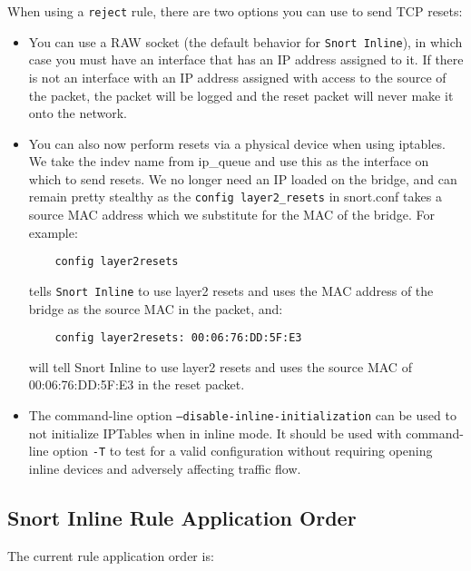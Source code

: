 \documentclass[english]{report}
\begin{document}
When using a \texttt{reject} rule, there are two options you can use to send
TCP resets:

\begin{itemize}

\item You can use a RAW socket (the default behavior for \texttt{Snort
Inline}), in which case you must have an interface that has an IP address
assigned to it. If there is not an interface with an IP address assigned with
access to the source of the packet, the packet will be logged and the reset
packet will never make it onto the network.

\item You can also now perform resets via a physical device when using
iptables.  We take the indev name from ip\_queue and use this as the interface
on which to send resets. We no longer need an IP loaded on the bridge, and can
remain pretty stealthy as the \texttt{config layer2\_resets} in
snort.conf takes a source MAC address which we substitute for the MAC of
the bridge. For example:

\begin{verbatim}
    config layer2resets
\end{verbatim}

tells \texttt{Snort Inline} to use layer2 resets and uses the MAC address of
the bridge as the source MAC in the packet, and:

\begin{verbatim}
    config layer2resets: 00:06:76:DD:5F:E3  
\end{verbatim}

will tell Snort Inline to use layer2 resets and uses the source MAC of
00:06:76:DD:5F:E3 in the reset packet.

\item The command-line option \texttt{--disable-inline-initialization} can be
used to not initialize IPTables when in inline mode.  It should be used with
command-line option \texttt{-T} to test for a valid configuration without
requiring opening inline devices and adversely affecting traffic flow.

\end{itemize}

\subsection{Snort Inline Rule Application Order}
\label{InlineRuleOrder}

The current rule application order is: 
\end{document}
